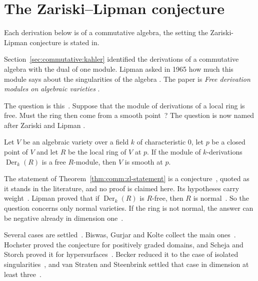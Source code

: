\section{The Zariski--Lipman conjecture}\label{sec:commutative:zariski-lipman}

Each derivation below is of a commutative algebra, the setting the Zariski-Lipman conjecture is stated in.

Section~\ref{sec:commutative:kahler} identified the derivations of a
commutative algebra with the dual of one module. Lipman asked in 1965 how much
this module says about the singularities of the algebra
\cite[p.~270]{BiswasGurjarKolte2014}. The paper is
\emph{Free derivation modules on algebraic varieties}
\cite[p.~270]{BiswasGurjarKolte2014}.

The question is this~\cite[p.~270]{BiswasGurjarKolte2014}. Suppose that the
module of derivations of a local ring is free. Must the ring then come from a
smooth point~\cite[p.~270]{BiswasGurjarKolte2014}? The question is now named
after Zariski and Lipman \cite[p.~270]{BiswasGurjarKolte2014}.

\begin{theorem}\label{thm:comm:zl-statement}
Let $V$ be an algebraic variety over a field $k$ of characteristic $0$, let
$p$ be a closed point of $V$ and let $R$ be the local ring of $V$ at $p$. If
the module of $k$-derivations $\operatorname{Der}_k(R)$ is a free $R$-module,
then $V$ is smooth at $p$.
\end{theorem}

The statement of Theorem~\ref{thm:comm:zl-statement} is a
conjecture~\cite[p.~270]{BiswasGurjarKolte2014}, quoted as it stands in the
literature, and no proof is claimed here. Its hypotheses carry
weight~\cite[p.~270]{BiswasGurjarKolte2014}. Lipman proved that if
$\operatorname{Der}_k(R)$ is $R$-free, then $R$ is
normal~\cite[p.~270]{BiswasGurjarKolte2014}. So the question concerns only
normal varieties. If the ring is not normal, the answer can be negative
already in dimension one~\cite[p.~270]{BiswasGurjarKolte2014}.

Several cases are settled~\cite[p.~270]{BiswasGurjarKolte2014}. Biswas, Gurjar
and Kolte collect the main
ones~\cite[p.~270]{BiswasGurjarKolte2014}. Hochster proved the conjecture for
positively graded domains, and Scheja and Storch proved it for
hypersurfaces~\cite[p.~270]{BiswasGurjarKolte2014}. Becker reduced it to the
case of isolated singularities~\cite[p.~270]{BiswasGurjarKolte2014}, and van
Straten and Steenbrink settled that case in dimension at least
three~\cite[p.~270]{BiswasGurjarKolte2014}.

